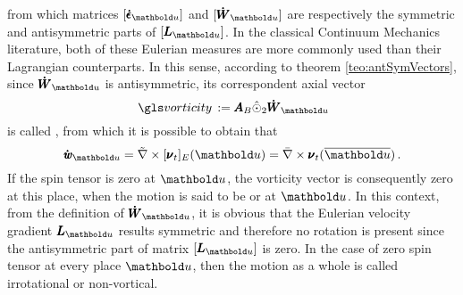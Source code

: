 from which matrices $[\tnr{\dot{\epsilon}}_{{\vto{u}}}]$ and $[\tnr{\dot{W}}_{{\vto{u}}}]$ are respectively the symmetric and antisymmetric parts of $[\tnr{L}_{{\vto{u}}}]$. In the classical Continuum Mechanics literature, both of these Eulerian measures are more commonly used than their Lagrangian counterparts. In this sense, according to theorem \ref{teo:antSymVectors}, since $\tnr{\dot{W}}_{{\vto{u}}}$ is antisymmetric, its correspondent axial vector 
\begin{equation}\label{eq:vectSpin}
\gloref{vorticity}:=\tnr{A}_B\hat{\odot}_2 \tnr{\dot{W}}_{{\vto{u}}}
\end{equation}
is called , from which it is possible to obtain that
\begin{equation}\label{eq:curlVelocities}
\tnr{\dot{\mathit{w}}}_{{\vto{u}}}=\tilde{\nabla}\times[\tnr{\nu}_t]_E({\vto{u}})=\bar{\nabla}\times\tnr{\nu}_t(\overline{\vto{u}})\,.
\end{equation}
If the spin tensor is zero at $\vto{u}$, the vorticity vector is consequently zero at this place, when the motion is said to be  or  at $\vto{u}$. In this context, from the definition of $\tnr{\dot{W}}_{{\vto{u}}}$, it is obvious that the Eulerian velocity gradient $\tnr{L}_{{\vto{u}}}$ results symmetric and therefore no rotation is present since the antisymmetric part of matrix $[\tnr{L}_{{\vto{u}}}]$ is zero. In the case of zero spin tensor at every place $\vto{u}$, then the motion as a whole is called irrotational or non-vortical.

